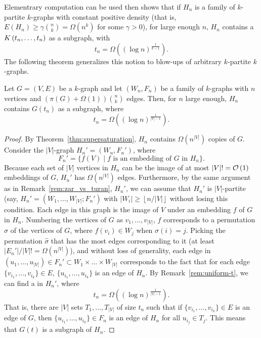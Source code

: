 Elementrary computation can be used then shows that if
$H_n$ is a family of $k$-partite $k$-graphs with constant positive density
(that is, $E(H_n) \geq \gamma \binom{n}{k} = \Omega\left( n^k \right)$ for some $\gamma > 0$),
for large enough $n$, $H_n$ contains a $K\left(t_n, \dots, t_n\right)$ as a subgraph, with
\[
    t_n = \Omega \left( (\log n)^{\frac{1}{k-1}}\right).
\]
The following theorem generalizes this notion to blow-ups of arbitrary $k$-partite $k$-graphs.

\begin{theorem} \label{thm:quant-blowup}
    Let $G = (V, E)$ be a $k$-graph and let $(W_n, F_n)$ be a family of $k$-graphs with $n$
    vertices and $\left( \pi(G) + \Omega (1) \right) \binom{n}{k}$ edges.
    Then, for $n$ large enough, $H_n$ contains $G(t_n)$ as a subgraph,
    where
    \[
        t_n = \Omega\left( (\log n)^{\frac{1}{|V|-1}} \right).
    \]
    \begin{proof}
        By Theorem~\ref{thm:supersaturation}, $H_n$ contains $\Omega\left( n^{|V|} \right)$ copies of $G$.
        Consider the $|V|$-graph $H_n' = (W_n, F_n')$, where
        \[
            F_n' = \{f(V) \mid f \text{ is an embedding of } G \text{ in } H_n\}.
        \]
        Because each set of $|V|$ vertices in $H_n$ can be the image of at most $|V|! = \mathcal{O}\left(1\right)$ embeddings of $G$,
        $H_n'$ has $\Omega\left(n^{|V|} \right)$ edges.
        Furthermore, by the same argument as in Remark~\ref{rem:zar_vs_turan}, $H_n'$, we can assume that
        $H_n'$ is $|V|$-partite (say, $H_n' = (W_1, \dots, W_{|V|}; F_n')$ with
        $|W_i| \geq \left\lfloor n / |V| \right\rfloor$
        without losing this condition.
        Each edge in this graph is the image of $V$ under an embedding $f$ of $G$ in $H_n$.
        Numbering the vertices of $G$ as $v_1, \dots, v_{|V|}$, $f$ corresponds to a permutation $\sigma$
        of the vertices of $G$, where $f(v_i) \in W_j$ when $\sigma(i) = j$.
        Picking the permutation $\hat{\sigma}$ that has the most edges corresponding to it
        (at least $|E_n'| / |V|! = \Omega\left( n^{|V|} \right)$), and without loss of generality,
        each edge in $(u_1, \dots, u_{|V|}) \in F_n' \subset W_1 \times \dots \times W_{|V|}$
        corresponds to the fact that for each edge $\{v_{i_1}, \dots, v_{i_k}\} \in E$,
        $\{u_{i_1}, \dots ,u_{i_k}\}$ is an edge of $H_n$.
        By Remark~\ref{rem:uniform-t}, we can find a  in $H_n'$,
        where
        \[
            t_n = \Omega\left( (\log n)^{\frac{1}{|V|-1}} \right).
        \]
        That is, there are $|V|$ sets $T_1, \dots, T_{|V|}$ of size $t_n$ such that
        if $\{v_{i_1}, \dots, v_{i_k}\} \in E$ is an edge of $G$, then
        $\{u_{i_1}, \dots, u_{i_k}\} \in F_n$ is an edge of $H_n$ for all $u_{i_j} \in T_j$.
        This means that $G(t)$ is a subgraph of $H_n$.

    \end{proof}
\end{theorem}


